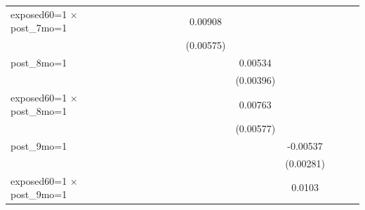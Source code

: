 \begin{table}[htbp]
\begin{tabular}{l*{11}{c}}
\addlinespace
exposed60=1 $\times$ post\_7mo=1&                     &                     &                     &                     &                     &     0.00908         &                     &                     &                     &                     &                     \\
                    &                     &                     &                     &                     &                     &   (0.00575)         &                     &                     &                     &                     &                     \\
\addlinespace
post\_8mo=1          &                     &                     &                     &                     &                     &                     &     0.00534         &                     &                     &                     &                     \\
                    &                     &                     &                     &                     &                     &                     &   (0.00396)         &                     &                     &                     &                     \\
\addlinespace
exposed60=1 $\times$ post\_8mo=1&                     &                     &                     &                     &                     &                     &     0.00763         &                     &                     &                     &                     \\
                    &                     &                     &                     &                     &                     &                     &   (0.00577)         &                     &                     &                     &                     \\
\addlinespace
post\_9mo=1          &                     &                     &                     &                     &                     &                     &                     &    -0.00537         &                     &                     &                     \\
                    &                     &                     &                     &                     &                     &                     &                     &   (0.00281)         &                     &                     &                     \\
\addlinespace
exposed60=1 $\times$ post\_9mo=1&                     &                     &                     &                     &                     &                     &                     &      0.0103         &                     &                     &                     \\

\end{tabular}
\end{table}
